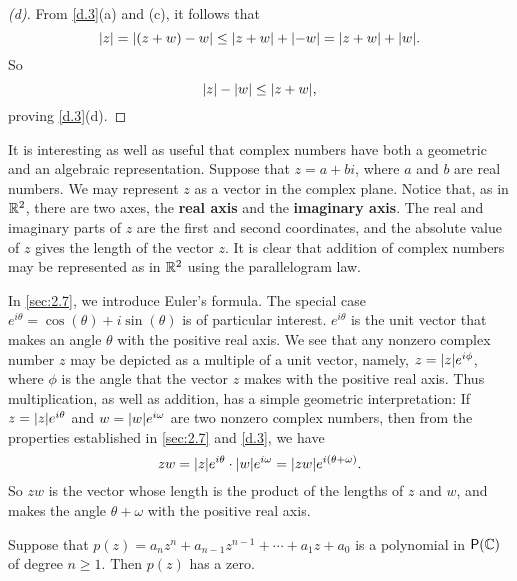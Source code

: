\begin{proof}[(d)]
  From \cref{d.3}(a) and (c), it follows that
  \[
    \abs{z} = \abs{(z + w) - w} \leq \abs{z + w} + \abs{-w} = \abs{z + w} + \abs{w}.
  \]
  So
  \[
    \abs{z} - \abs{w} \leq \abs{z + w},
  \]
  proving \cref{d.3}(d).
\end{proof}

\begin{defn}\label{d.0.6}
  It is interesting as well as useful that complex numbers have both a geometric and an algebraic representation.
  Suppose that \(z = a + bi\), where \(a\) and \(b\) are real numbers.
  We may represent \(z\) as a vector in the complex plane.
  Notice that, as in \(\mathbb{R}^2\), there are two axes, the \textbf{real axis} and the \textbf{imaginary axis}.
  The real and imaginary parts of \(z\) are the first and second coordinates, and the absolute value of \(z\) gives the length of the vector \(z\).
  It is clear that addition of complex numbers may be represented as in \(\mathbb{R}^2\) using the parallelogram law.

  In \cref{sec:2.7}, we introduce Euler's formula.
  The special case \(e^{i \theta} = \cos(\theta) + i \sin(\theta)\) is of particular interest.
  \(e^{i \theta}\) is the unit vector that makes an angle \(\theta\) with the positive real axis.
  We see that any nonzero complex number \(z\) may be depicted as a multiple of a unit vector, namely, \(z = \abs{z} e^{i \phi}\), where \(\phi\) is the angle that the vector \(z\) makes with the positive real axis.
  Thus multiplication, as well as addition, has a simple geometric interpretation:
  If \(z = \abs{z} e^{i \theta}\) and \(w = \abs{w} e^{i \omega}\) are two nonzero complex numbers, then from the properties established in \cref{sec:2.7} and \cref{d.3}, we have
  \[
    zw = \abs{z} e^{i \theta} \cdot \abs{w} e^{i \omega} = \abs{zw} e^{i (\theta + \omega)}.
  \]
  So \(zw\) is the vector whose length is the product of the lengths of \(z\) and \(w\), and makes the angle \(\theta + \omega\) with the positive real axis.
\end{defn}

\begin{thm}\label{d.4}
  Suppose that \(p(z) = a_n z^n + a_{n - 1} z^{n - 1} + \cdots + a_1 z + a_0\) is a polynomial in \(\ps{\C}\) of degree \(n \geq 1\).
  Then \(p(z)\) has a zero.
\end{thm}

